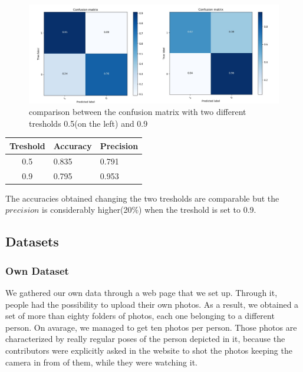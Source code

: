 \begin{figure}
\begin{center}
\includegraphics[width=1\linewidth]{images/cm.jpg}
\end{center}
   \caption{comparison between the confusion matrix with two different tresholds 0.5(on the left) and 0.9}
\label{fig:conf_matrices}
\end{figure}


\begin{table}[]
\centering
\begin{tabular}{|c|ll|}
\hline
Treshold & Accuracy & Precision \\ \hline
0.5                          & 0.835    & 0.791     \\ \hline
0.9                          & 0.795    & 0.953     \\ \hline
\end{tabular}
\end{table}


The accuracies obtained changing the two tresholds are comparable but the $precision$ is considerably higher(20\%) when the treshold is set to 0.9.



\subsection{Datasets}
\subsubsection{Own Dataset}
We gathered our own data through a web page \cite{gdpdataret} that we set up. Through it, people had the possibility to upload their own photos. As a result, we obtained a set of more than eighty folders of photos, each one belonging to a different person. On avarage, we managed to get ten photos per person. Those photos are characterized by really regular poses of the person depicted in it, because the contributors were explicitly asked in the website to shot the photos keeping the camera in from of them, while they were watching it.
